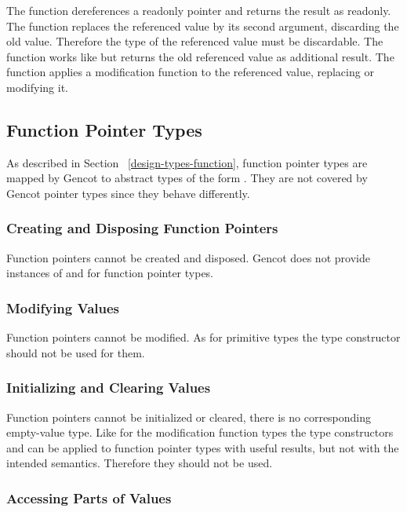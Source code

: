 The function  dereferences a readonly pointer and returns the result as readonly. The function 
replaces the referenced value by its second argument, discarding the old value. Therefore the type  of the referenced 
value must be discardable. The function  works like  but returns the old referenced value as 
additional result. The function  applies a modification function to the referenced value, replacing or
modifying it.

\subsection{Function Pointer Types}
\label{design-operations-function}

As described in Section ~\ref{design-types-function}, function pointer types are mapped by Gencot to abstract types of the form 
. They are not covered by Gencot pointer types since they behave differently.

\subsubsection{Creating and Disposing Function Pointers}

Function pointers cannot be created and disposed. Gencot does not provide instances of  and 
for function pointer types.

\subsubsection{Modifying Values}

Function pointers cannot be modified. As for primitive types the type constructor  should not be used for them.

\subsubsection{Initializing and Clearing Values}

Function pointers cannot be initialized or cleared, there is no corresponding empty-value type.
Like for the modification function types the type constructors
 and  can be applied to function pointer types with useful results, but not with the intended semantics.
Therefore they should not be used.

\subsubsection{Accessing Parts of Values}

